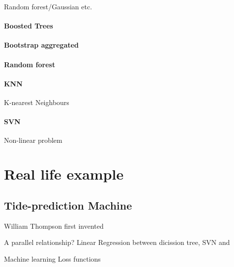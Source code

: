 \documentclass[12pt,a4paper]{article}
\begin{document}
Random forest/Gaussian etc.
\paragraph{Boosted Trees}
\paragraph{Bootstrap aggregated}
\paragraph{Random forest}
\paragraph*{KNN}
K-nearest Neighbours
\paragraph*{SVN}
Non-linear problem
\section{Real life example}
\subsection{Tide-prediction Machine}
William Thompson first invented 

A parallel relationship? Linear Regression between dicission tree, SVN and 

Machine learning Loss functions
\end{document}
